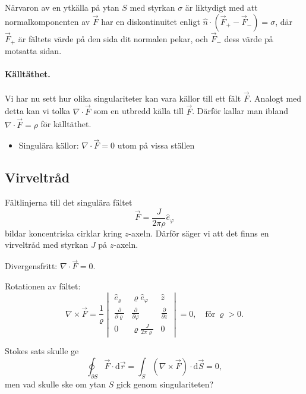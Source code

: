 \documentclass[%
oneside,                 %
final,                   %
10pt]{article}
\begin{document}
Närvaron av en ytkälla på ytan $S$ med styrkan $\sigma$ är liktydigt med att
normalkomponenten av $\vec F$ har en diskontinuitet enligt $\hat n\cdot(\vec F_+-\vec F_-)=\sigma$, där $\vec F_+$ är fältets värde på den sida dit normalen pekar, och $\vec F_-$ dess värde på motsatta sidan.


\paragraph{Källtäthet.}


\vspace{3mm}


Vi har nu sett hur olika singulariteter kan vara källor till ett fält $\vec{F}$.  Analogt med detta kan vi tolka $\nabla \cdot \vec{F}$ som en utbredd källa till $\vec{F}$.  Därför kallar man ibland $\nabla \cdot \vec{F} = \rho$ för källtäthet.

\begin{itemize}
\item Singulära källor: $\nabla \cdot \vec{F} = 0$ utom på vissa ställen 
\end{itemize}

\noindent
\subsection{Virveltråd}

Fältlinjerna till det singulära fältet
\begin{equation}
  \vec{F} = \frac{J}{2 \pi \rho} \hat{e}_{\varphi}
\end{equation}
bildar koncentriska cirklar kring $z$-axeln.  Därför säger vi att det finns en virveltråd med styrkan $J$ på $z$-axeln.  

Divergensfritt: $\nabla \cdot \vec{F} = 0$.

Rotationen av fältet:
\begin{equation}
\nabla\times\vec F=\frac{1}{\varrho}
	\begin{vmatrix}
        \hat{e}_\varrho&\varrho\hat{e}_\varphi&\hat z \\ 
        \frac{\partial}{\partial \varrho} & 
\frac{\partial}{\partial \varphi}
        & 
\frac{\partial}{\partial z} \\ 
        0 & \varrho \frac{J}{2\pi\varrho} & 0
    \end{vmatrix} = 0, \quad \mathrm{för~} \varrho > 0.
\end{equation}

Stokes sats skulle ge
\begin{equation}
	\oint_{\partial S} \vec{F} \cdot \mbox{d} \vec{r} = \int_S \left( \nabla \times \vec{F} \right) \cdot \mbox{d} \vec{S} = 0,
\end{equation}
men vad skulle ske om ytan $S$ gick genom singulariteten?
\end{document}
